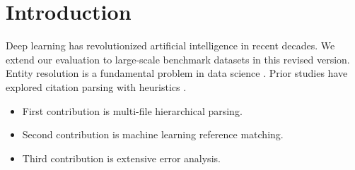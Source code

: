 \section{Introduction}
Deep learning has revolutionized artificial intelligence in recent decades.
We extend our evaluation to large-scale benchmark datasets in this revised version.
Entity resolution is a fundamental problem in data science \cite{vaswani2017attention}.
Prior studies have explored citation parsing with heuristics \cite{devlin2018bert}.

\begin{itemize}
\item First contribution is multi-file hierarchical parsing.
\item Second contribution is machine learning reference matching.
\item Third contribution is extensive error analysis.
\end{itemize}
